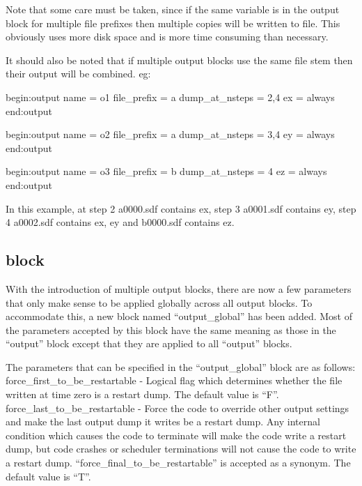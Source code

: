 Note that some care must be taken, since if the same variable is
in the output block for multiple file prefixes then multiple
copies will be written to file. This obviously uses more disk
space and is more time consuming than necessary.

It should also be noted that if multiple output blocks use the
same file stem then their output will be combined. eg:
\begin{boxverbatim}
begin:output
   name = o1
   file_prefix = a
   dump_at_nsteps = 2,4
   ex = always
end:output

begin:output
   name = o2
   file_prefix = a
   dump_at_nsteps = 3,4
   ey = always
end:output

begin:output
   name = o3
   file_prefix = b
   dump_at_nsteps = 4
   ez = always
end:output
\end{boxverbatim}

In this example, at step 2 a0000.sdf contains ex, step 3 a0001.sdf
contains ey, step 4 a0002.sdf contains ex, ey and b0000.sdf
contains ez.


\subsection{\texorpdfstring
  { block}
  {           {output\_global} block}}
\label{sec:output_global_block}

With the introduction of multiple output blocks, there are now a few parameters
that only make sense to be applied globally across all output blocks. To
accommodate this, a new block named ``output\_global'' has been added.
Most of the parameters accepted by this block have the same meaning as those
in the ``output'' block except that they are applied to all ``output'' blocks.

The parameters that can be specified in the ``output\_global'' block are
as follows:\\

{\emphtext force\_first\_to\_be\_restartable} - Logical flag which determines
  whether the file written at time zero is a restart dump. The default value
  is ``F''.\\

{\emphtext force\_last\_to\_be\_restartable} - Force the code to override
other output settings and make the last output dump it writes be a restart
dump. Any internal condition which causes the code to terminate will make the
code write a restart dump, but code crashes or scheduler terminations will not
cause the code to write a restart dump.
``force\_final\_to\_be\_restartable'' is accepted as a synonym.
The default value is ``T''.\\

